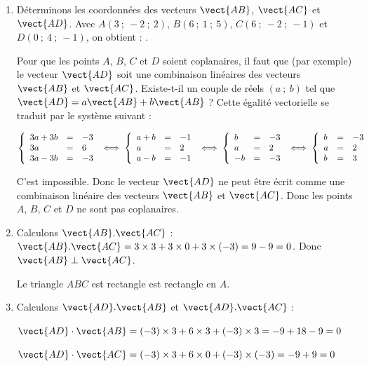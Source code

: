 
\medskip

\begin{enumerate}
\item Déterminons les coordonnées des vecteurs $\vect{AB}$, $\vect{AC}$ et $\vect{AD}$. Avec $A(3~;~-2~;~2)$, $B(6~;~1~;~5)$, $C(6~;~-2~;~-1)$ et $D(0~;~4~;~-1)$, on obtient : 
	 \quad {} \quad {}.
	
Pour que les points $A$, $B$, $C$ et $D$ soient coplanaires, il faut que (par exemple) le vecteur $\vect{AD}$ soit une combinaison linéaires des vecteurs $\vect{AB}$ et $\vect{AC}$. Existe-t-il un couple de réels $(a~;~b)$ tel que $\vect{AD}=a\vect{AB}+b\vect{AB}$ ? Cette égalité vectorielle se traduit par le système suivant :
	
$\left\{\begin{array}{l c l} 3a+3b&=&-3\\3a &=& 6\\3a-3b&=&-3	\end{array}\right. \iff \left\{\begin{array}{l c l} a+b&=&-1\\a &=& 2\\a-b&=&-1	\end{array}\right.\iff \left\{\begin{array}{l c l} b&=&-3\\a &=& 2\\-b&=&-3 \end{array}\right. \iff \left\{\begin{array}{l c l} b&=&-3\\a &=& 2\\b&=&3	\end{array}\right.$
	
C'est impossible. Donc le vecteur $\vect{AD}$ ne peut être écrit comme une combinaison linéaire des vecteurs $\vect{AB}$ et $\vect{AC}$. Donc les points $A$, $B$, $C$ et $D$ ne sont pas coplanaires.
	\item Calculons $\vect{AB}.\vect{AC}$ : $\vect{AB}.\vect{AC}=3\times3+3\times 0+ 3\times (-3) = 9 - 9 = 0$. Donc $\vect{AB}\perp \vect{AC}$.
	
Le triangle $ABC$ est rectangle est rectangle en $A$.
\item Calculons $\vect{AD}.\vect{AB}$ et $\vect{AD}.\vect{AC}$ :

$\vect{AD} \cdot \vect{AB}= (-3)\times 3+6\times 3 + (-3)\times 3 = - 9+18-9=0$

$\vect{AD} \cdot \vect{AC}= (-3)\times 3+6\times 0 + (-3)\times (-3)=-9+9=0$


\end{enumerate}
